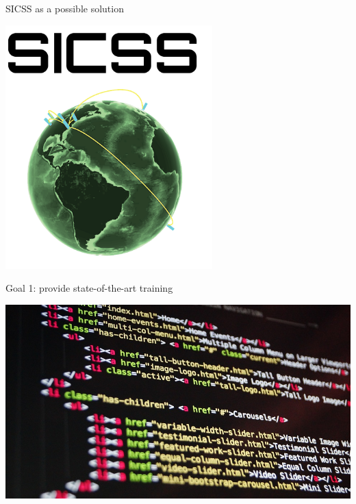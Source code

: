 \documentclass{beamer}
\begin{document}
\begin{frame}{SICSS as a possible solution}

\begin{center}
\includegraphics[width=0.6\textwidth]{figures/sicss_logo.png}
\end{center}

\end{frame}

\begin{frame}{Goal 1: provide state-of-the-art training}

\begin{center}
\includegraphics[width=1.0\textwidth]{figures/code.jpg}
\end{center}

\end{frame}
\end{document}
